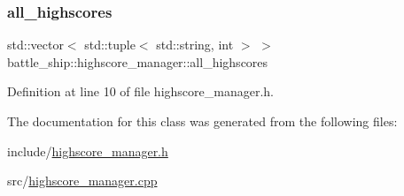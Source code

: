 \subsubsection{\texorpdfstring{all\+\_\+highscores}{all\_highscores}}
{\footnotesize\ttfamily std\+::vector$<$ std\+::tuple$<$ std\+::string, int $>$ $>$ battle\+\_\+ship\+::highscore\+\_\+manager\+::all\+\_\+highscores\hspace{0.3cm}{\ttfamily [static]}}



Definition at line 10 of file highscore\+\_\+manager.\+h.



The documentation for this class was generated from the following files\+:\begin{DoxyCompactItemize}
\item 
include/\hyperlink{highscore__manager_8h}{highscore\+\_\+manager.\+h}\item 
src/\hyperlink{highscore__manager_8cpp}{highscore\+\_\+manager.\+cpp}\end{DoxyCompactItemize}
